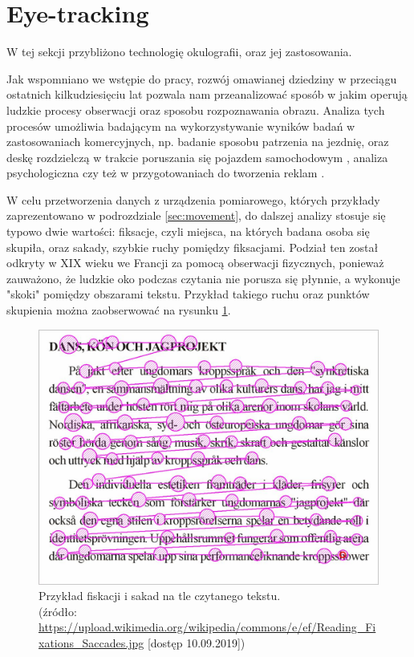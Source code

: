 \section{Eye-tracking}
\label{sec:eyetracking}
W tej sekcji przybliżono technologię okulografii, oraz jej zastosowania.\par
Jak wspomniano we wstępie do pracy, rozwój omawianej dziedziny w przeciągu ostatnich kilkudziesięciu lat pozwala nam przeanalizować sposób w jakim operują ludzkie procesy obserwacji oraz sposobu rozpoznawania obrazu. Analiza tych procesów umożliwia badającym na wykorzystywanie wyników badań w zastosowaniach komercyjnych, np. badanie sposobu patrzenia na jezdnię, oraz deskę rozdzielczą w trakcie poruszania się pojazdem samochodowym \cite{CarSteering}, analiza psychologiczna \cite{GazeEyeTrackingSolutions} czy też w przygotowaniach do tworzenia reklam \cite{Advertising}.\par
W celu przetworzenia danych z urządzenia pomiarowego, których przykłady zaprezentowano w podrozdziale \ref{sec:movement}, do dalszej analizy stosuje się typowo dwie wartości: fiksacje, czyli miejsca, na których badana osoba się skupiła, oraz sakady, szybkie ruchy pomiędzy fiksacjami. Podział ten został odkryty w XIX wieku we Francji za pomocą obserwacji fizycznych, ponieważ zauważono, że ludzkie oko podczas czytania nie porusza się płynnie, a wykonuje "skoki" pomiędzy obszarami tekstu. Przykład takiego ruchu oraz punktów skupienia można zaobserwować na rysunku \ref{fig:fiksacje}.
\begin{figure}[H]
    \centering
    \captionsetup{justification=centering,margin=2cm}
    \includegraphics[width=0.8\linewidth]{resources/fixation_example.jpg}
    \caption[Przykład fiskacji i sakad na tle czytanego tekstu.]{Przykład fiskacji i sakad na tle czytanego tekstu.\\\hspace{\textwidth}
    \small(źródło: \url{https://upload.wikimedia.org/wikipedia/commons/e/ef/Reading_Fixations_Saccades.jpg} [dostęp 10.09.2019])}
    \label{fig:fiksacje}
\end{figure}
